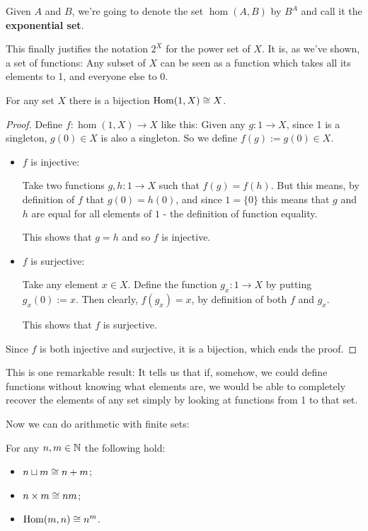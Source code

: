 \begin{df}
	Given $A$ and $B$, we're going to denote the set $\hom(A,B)$ by $B^A$ and call it the \textbf{exponential set}.
\end{df}

\begin{rmk}
	This finally justifies the notation $2^X$ for the power set of $X$. It is, as we've shown, a set of functions: Any subset of $X$ can be seen as a function which takes all its elements to 1, and everyone else to 0.
\end{rmk}

\begin{theorem}
	For any set $X$ there is a bijection $\mathrm{Hom}(1,X)\cong X$.
\end{theorem}
\begin{proof}
	Define $f:\hom(1,X)\to X$ like this: Given any $g:1\to X$, since 1 is a singleton, $g(0)\in X$ is also a singleton. So we define $f(g):=g(0)\in X$.
	
	\begin{itemize}
		\item $f$ is injective:
		
		Take two functions $g,h:1\to X$ such that $f(g)=f(h)$. But this means, by definition of $f$ that $g(0)=h(0)$, and since $1=\{0\}$ this means that $g$ and $h$ are equal for all elements of $1$ - the definition of function equality.
		
		This shows that $g=h$ and so $f$ is injective.
		
		\item $f$ is surjective:
		
		Take any element $x\in X$. Define the function $g_x:1\to X$ by putting $g_x(0):=x$. Then clearly, $f(g_x)=x$, by definition of both $f$ and $g_x$.
		
		This shows that $f$ is surjective.
	\end{itemize}

Since $f$ is both injective and surjective, it is a bijection, which ends the proof.
\end{proof}

\begin{rmk}
	This is one remarkable result: It tells us that if, somehow, we could define functions without knowing what elements are, we would be able to completely recover the elements of any set simply by looking at functions from 1 to that set.
\end{rmk}

Now we can do arithmetic with finite sets:
\begin{lemma}
	For any $n,m\in \mathbb N$ the following hold:
	\begin{itemize}
		\item $n\sqcup m\cong n+m$;
		\item $n\times m\cong nm$;
		\item $\mathrm{Hom}(m,n)\cong n^m$.
	\end{itemize}
\end{lemma}


